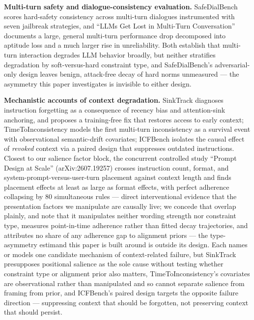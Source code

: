 \documentclass[11pt]{article}
\begin{document}
\textbf{Multi-turn safety and dialogue-consistency evaluation.} SafeDialBench scores hard-safety consistency across multi-turn dialogues instrumented with seven jailbreak strategies, and ``LLMs Get Lost in Multi-Turn Conversation'' documents a large, general multi-turn performance drop decomposed into aptitude loss and a much larger rise in unreliability. Both establish that multi-turn interaction degrades LLM behavior broadly, but neither stratifies degradation by soft-versus-hard constraint type, and SafeDialBench's adversarial-only design leaves benign, attack-free decay of hard norms unmeasured --- the asymmetry this paper investigates is invisible to either design.

\textbf{Mechanistic accounts of context degradation.} SinkTrack diagnoses instruction forgetting as a consequence of recency bias and attention-sink anchoring, and proposes a training-free fix that restores access to early context; TimeToInconsistency models the first multi-turn inconsistency as a survival event with observational semantic-drift covariates; ICFBench isolates the causal effect of \emph{revoked} context via a paired design that suppresses outdated instructions. Closest to our salience factor block, the concurrent controlled study ``Prompt Design at Scale'' (arXiv:2607.19257) crosses instruction count, format, and system-prompt-versus-user-turn placement against context length and finds placement effects at least as large as format effects, with perfect adherence collapsing by 80 simultaneous rules --- direct interventional evidence that the presentation factors we manipulate are causally live; we concede that overlap plainly, and note that it manipulates neither wording strength nor constraint type, measures point-in-time adherence rather than fitted decay trajectories, and attributes no share of any adherence gap to alignment priors --- the type-asymmetry estimand this paper is built around is outside its design. Each names or models one candidate mechanism of context-related failure, but SinkTrack presupposes positional salience as the sole cause without testing whether constraint type or alignment prior also matters, TimeToInconsistency's covariates are observational rather than manipulated and so cannot separate salience from framing from prior, and ICFBench's paired design targets the opposite failure direction --- suppressing context that should be forgotten, not preserving context that should persist.
\end{document}
